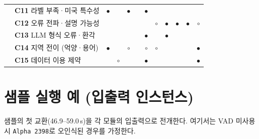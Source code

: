 \documentclass[10pt,a4paper]{article}
\newcommand{\ch}[1]{\textbf{\textcolor{red!60!black}{#1}}}
\begin{document}
\begin{center}
\begin{tabular}{@{}l l c c c c c c c c c c@{}}
& \ch{C11} 라벨 부족·미국 특수성 & $\bullet$ &  & $\bullet$ &  & $\bullet$ &  &  &  & &  \\
& \ch{C12} 오류 전파·설명 가능성 &  &  &  &  &  & $\circ$ & $\bullet$ & $\bullet$ & $\bullet$& $\circ$ \\
& \ch{C13} LLM 형식 오류·환각 &  &  &  &  & $\bullet$ &  & $\bullet$ &  & &  \\
& \ch{C14} 지역 전이 (억양·용어) & $\bullet$ &  & $\circ$ &  & $\circ$ & $\circ$ &  &  & & $\bullet$ \\
& \ch{C15} 데이터 이용 제약 &  & $\circ$ &  &  & $\bullet$ &  &  &  &  & $\bullet$ \\
\bottomrule
\end{tabular}
\end{center}

\section{샘플 실행 예 (입출력 인스턴스)}\label{sec:example}
샘플의 첫 교환(46.9--59.0\,s)을 각 모듈의 입출력으로 전개한다. 여기서는 VAD 미사용 시 \texttt{Alpha 2398}로 오인식된 경우를 가정한다.
\end{document}
